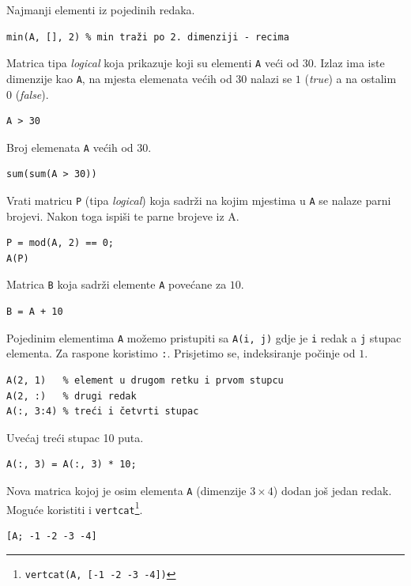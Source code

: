 \documentclass[a4paper, 10pt]{article}
\newcommand{\spec}[1]{\texttt{#1}} %
\newcommand{\eng}[1]{\emph{#1}} %
\begin{document}
Najmanji elementi iz pojedinih redaka.

\begin{lstlisting}
min(A, [], 2) % min traži po 2. dimenziji - recima
\end{lstlisting}

Matrica tipa \eng{logical} koja prikazuje koji su elementi \spec{A} veći od $30$.
Izlaz ima iste dimenzije kao \spec{A}, na mjesta elemenata većih od $30$ nalazi se $1$ (\eng{true}) a na ostalim $0$ (\eng{false}).

\begin{lstlisting}
A > 30
\end{lstlisting}

Broj elemenata \spec{A} većih od $30$.

\begin{lstlisting}
sum(sum(A > 30))
\end{lstlisting}

Vrati matricu \spec{P} (tipa \eng{logical}) koja sadrži na kojim mjestima u \spec{A} se nalaze parni brojevi.
Nakon toga ispiši te parne brojeve iz {A}.

\begin{lstlisting}
P = mod(A, 2) == 0;
A(P)
\end{lstlisting}

Matrica \spec{B} koja sadrži elemente \spec{A} povećane za $10$.

\begin{lstlisting}
B = A + 10
\end{lstlisting}

Pojedinim elementima \spec{A} možemo pristupiti sa \spec{A(i, j)} gdje je \spec{i} redak a \spec{j} stupac elementa.
Za raspone koristimo \spec{:}.
Prisjetimo se, indeksiranje počinje od $1$.

\begin{lstlisting}
A(2, 1)   % element u drugom retku i prvom stupcu
A(2, :)   % drugi redak
A(:, 3:4) % treći i četvrti stupac
\end{lstlisting}

Uvećaj treći stupac 10 puta.

\begin{lstlisting}
A(:, 3) = A(:, 3) * 10;
\end{lstlisting}

Nova matrica kojoj je osim elementa \spec{A} (dimenzije $3 \times 4$) dodan još jedan redak.
Moguće koristiti i \spec{vertcat}\footnote{\spec{vertcat(A, [-1 -2 -3 -4])}}.

\begin{lstlisting}
[A; -1 -2 -3 -4]
\end{lstlisting}
\end{document}
